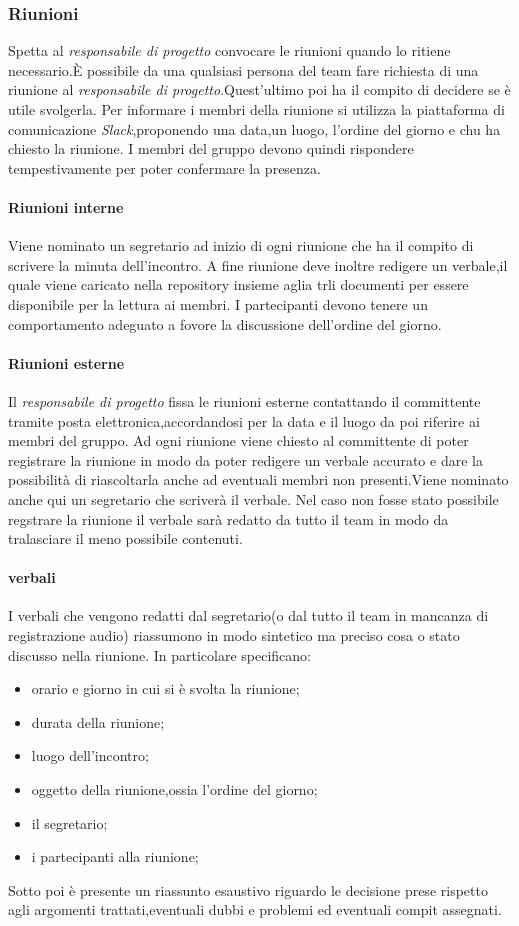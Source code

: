 		\subsubsection{Riunioni}
			Spetta al \textit{responsabile di progetto} convocare le riunioni quando lo ritiene necessario.È possibile da una qualsiasi persona del team fare richiesta di una riunione al \textit{responsabile di progetto}.Quest'ultimo poi ha il compito di decidere se è utile svolgerla.  Per informare i membri della riunione si utilizza la piattaforma di comunicazione \textit{Slack},proponendo una data,un luogo, l'ordine del giorno e chu ha chiesto la riunione. I membri del gruppo devono quindi rispondere tempestivamente per poter confermare la presenza.
			\paragraph{Riunioni interne}
				Viene nominato un segretario ad inizio di ogni riunione che ha il compito di scrivere la minuta dell'incontro. A fine riunione deve inoltre redigere un verbale,il quale viene caricato nella repository insieme aglia trli documenti per essere disponibile per la lettura ai membri. I partecipanti devono tenere un comportamento adeguato a fovore la discussione dell'ordine del giorno.
			\paragraph{Riunioni esterne}
				Il \textit{responsabile di progetto} fissa le riunioni esterne contattando il committente tramite posta elettronica,accordandosi per la data e il luogo da poi riferire ai membri del gruppo.
				Ad ogni riunione viene chiesto al committente di poter registrare la riunione in modo da poter redigere un verbale accurato e dare la possibilità di riascoltarla anche ad eventuali membri non presenti.Viene nominato anche qui un segretario che scriverà il verbale. Nel caso non fosse stato possibile regstrare la riunione il verbale sarà redatto da tutto il team in modo da tralasciare il meno possibile contenuti.
			\paragraph{verbali}
				I verbali che vengono redatti dal segretario(o dal tutto il team in mancanza di registrazione audio) riassumono in modo sintetico ma preciso cosa o stato discusso nella riunione. 
				In particolare specificano:
				\begin{itemize}
					\item orario e giorno in cui si è svolta la riunione;
					\item durata della riunione;
					\item luogo dell'incontro;
					\item oggetto della riunione,ossia l'ordine del giorno;
					\item il segretario;
					\item i partecipanti alla riunione;
				\end{itemize}
				Sotto poi è presente un riassunto esaustivo riguardo le decisione prese rispetto agli argomenti trattati,eventuali dubbi e problemi ed eventuali compit assegnati.
